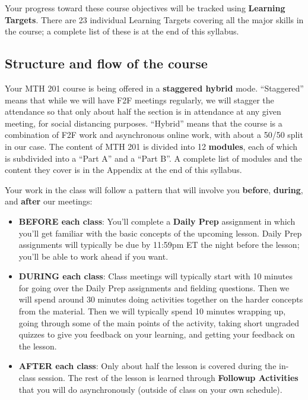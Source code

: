 \documentclass[]{article}
\providecommand{\tightlist}{%
  \setlength{\itemsep}{0pt}\setlength{\parskip}{0pt}}
\begin{document}
Your progress toward these course objectives will be tracked using
\textbf{Learning Targets}. There are 23 individual Learning Targets
covering all the major skills in the course; a complete list of these is
at the end of this syllabus.

\hypertarget{structure-and-flow-of-the-course}{%
\subsection{Structure and flow of the
course}\label{structure-and-flow-of-the-course}}

Your MTH 201 course is being offered in a \textbf{staggered hybrid}
mode. ``Staggered'' means that while we will have F2F meetings
regularly, we will stagger the attendance so that only about half the
section is in attendance at any given meeting, for social distancing
purposes. ``Hybrid'' means that the course is a combination of F2F work
and asynchronous online work, with about a 50/50 split in our case. The
content of MTH 201 is divided into 12 \textbf{modules}, each of which is
subdivided into a ``Part A'' and a ``Part B''. A complete list of
modules and the content they cover is in the Appendix at the end of this
syllabus.

Your work in the class will follow a pattern that will involve you
\textbf{before}, \textbf{during}, and \textbf{after} our meetings:

\begin{itemize}
\tightlist
\item
  \textbf{BEFORE each class}: You'll complete a \textbf{Daily Prep}
  assignment in which you'll get familiar with the basic concepts of the
  upcoming lesson. Daily Prep assignments will typically be due by
  11:59pm ET the night before the lesson; you'll be able to work ahead
  if you want.
\item
  \textbf{DURING each class}: Class meetings will typically start with
  10 minutes for going over the Daily Prep assignments and fielding
  questions. Then we will spend around 30 minutes doing activities
  together on the harder concepts from the material. Then we will
  typically spend 10 minutes wrapping up, going through some of the main
  points of the activity, taking short ungraded quizzes to give you
  feedback on your learning, and getting your feedback on the lesson.
\item
  \textbf{AFTER each class}: Only about half the lesson is covered
  during the in-class session. The rest of the lesson is learned through
  \textbf{Followup Activities} that you will do asynchronously (outside
  of class on your own schedule).
\end{itemize}
\end{document}
